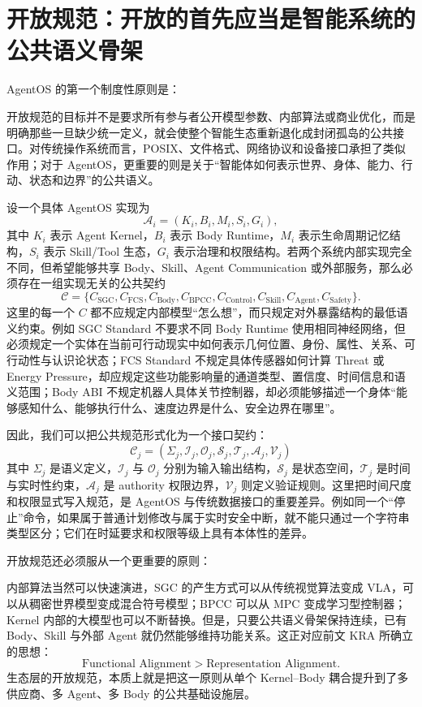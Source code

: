 \section{开放规范：开放的首先应当是智能系统的公共语义骨架}

AgentOS 的第一个制度性原则是：
\begin{statementbox}
\centering
{}
\end{statementbox}
开放规范的目标并不是要求所有参与者公开模型参数、内部算法或商业优化，而是明确那些一旦缺少统一定义，就会使整个智能生态重新退化成封闭孤岛的公共接口。对传统操作系统而言，POSIX、文件格式、网络协议和设备接口承担了类似作用；对于 AgentOS，更重要的则是关于``智能体如何表示世界、身体、能力、行动、状态和边界''的公共语义。

设一个具体 AgentOS 实现为
\[
\mathcal A_i=
(K_i,B_i,M_i,S_i,G_i),
\]
其中 $K_i$ 表示 Agent Kernel，$B_i$ 表示 Body Runtime，$M_i$ 表示生命周期记忆结构，$S_i$ 表示 Skill/Tool 生态，$G_i$ 表示治理和权限结构。若两个系统内部实现完全不同，但希望能够共享 Body、Skill、Agent Communication 或外部服务，那么必须存在一组实现无关的公共契约
\[
\mathcal C=
\{
C_{\mathrm{SGC}},
C_{\mathrm{FCS}},
C_{\mathrm{Body}},
C_{\mathrm{BPCC}},
C_{\mathrm{Control}},
C_{\mathrm{Skill}},
C_{\mathrm{Agent}},
C_{\mathrm{Safety}}
\}.
\]
这里的每一个 $C$ 都不应规定内部模型``怎么想''，而只规定对外暴露结构的最低语义约束。例如 SGC Standard 不要求不同 Body Runtime 使用相同神经网络，但必须规定一个实体在当前可行动现实中如何表示几何位置、身份、属性、关系、可行动性与认识论状态；FCS Standard 不规定具体传感器如何计算 Threat 或 Energy Pressure，却应规定这些功能影响量的通道类型、置信度、时间信息和语义范围；Body ABI 不规定机器人具体关节控制器，却必须能够描述一个身体``能够感知什么、能够执行什么、速度边界是什么、安全边界在哪里''。

因此，我们可以把公共规范形式化为一个接口契约：
\[
\boxed{
\mathcal C_j=
(\Sigma_j,\mathcal I_j,\mathcal O_j,
\mathcal S_j,\mathcal T_j,\mathcal A_j,\mathcal V_j)
}
\]
其中 $\Sigma_j$ 是语义定义，$\mathcal I_j$ 与 $\mathcal O_j$ 分别为输入输出结构，$\mathcal S_j$ 是状态空间，$\mathcal T_j$ 是时间与实时性约束，$\mathcal A_j$ 是 authority 权限边界，$\mathcal V_j$ 则定义验证规则。这里把时间尺度和权限显式写入规范，是 AgentOS 与传统数据接口的重要差异。例如同一个``停止''命令，如果属于普通计划修改与属于实时安全中断，就不能只通过一个字符串类型区分；它们在时延要求和权限等级上具有本体性的差异。

开放规范还必须服从一个更重要的原则：
\begin{statementbox}
\centering
{}
\end{statementbox}
内部算法当然可以快速演进，SGC 的产生方式可以从传统视觉算法变成 VLA，可以从稠密世界模型变成混合符号模型；BPCC 可以从 MPC 变成学习型控制器；Kernel 内部的大模型也可以不断替换。但是，只要公共语义骨架保持连续，已有 Body、Skill 与外部 Agent 就仍然能够维持功能关系。这正对应前文 KRA 所确立的思想：
\[
\text{Functional Alignment}
>
\text{Representation Alignment}.
\]
生态层的开放规范，本质上就是把这一原则从单个 Kernel--Body 耦合提升到了多供应商、多 Agent、多 Body 的公共基础设施层。

